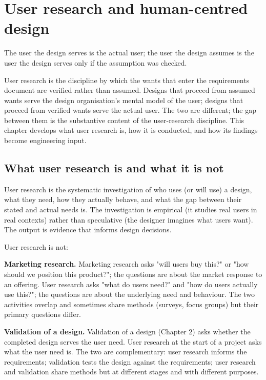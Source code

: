 \chapter{User research and human-centred design}
\label{vol11:ch03}

\epigraph{The user the design serves is the actual user; the user the design assumes is the user the design serves only if the assumption was checked.}{}


\noindent
User research is the discipline by which the wants that enter the requirements document are verified rather than assumed. Designs that proceed from assumed wants serve the design organisation's mental model of the user; designs that proceed from verified wants serve the actual user. The two are different; the gap between them is the substantive content of the user-research discipline. This chapter develops what user research is, how it is conducted, and how its findings become engineering input.

\section{What user research is and what it is not}

User research is the systematic investigation of who uses (or will use) a design, what they need, how they actually behave, and what the gap between their stated and actual needs is. The investigation is empirical (it studies real users in real contexts) rather than speculative (the designer imagines what users want). The output is evidence that informs design decisions.

User research is not:

\textbf{Marketing research.} Marketing research asks "will users buy this?" or "how should we position this product?"; the questions are about the market response to an offering. User research asks "what do users need?" and "how do users actually use this?"; the questions are about the underlying need and behaviour. The two activities overlap and sometimes share methods (surveys, focus groups) but their primary questions differ.

\textbf{Validation of a design.} Validation of a design (Chapter 2) asks whether the completed design serves the user need. User research at the start of a project asks what the user need is. The two are complementary: user research informs the requirements; validation tests the design against the requirements; user research and validation share methods but at different stages and with different purposes.

